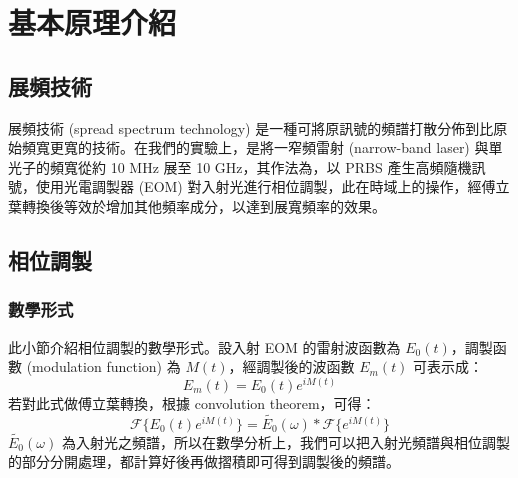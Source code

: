 \documentclass[class=NCU_thesis, crop=false]{standalone}
\begin{document}
\chapter{基本原理介紹}

\section{展頻技術}

展頻技術 (spread spectrum technology) 是一種可將原訊號的頻譜打散分佈到比原始頻寬更寬的技術。在我們的實驗上，是將一窄頻雷射 (narrow-band laser) 與單光子的頻寬從約 10 MHz 展至 10 GHz，其作法為，以 PRBS 產生高頻隨機訊號，使用光電調製器 (EOM) 對入射光進行相位調製，此在時域上的操作，經傅立葉轉換後等效於增加其他頻率成分，以達到展寬頻率的效果。
\section{相位調製}

\subsection{數學形式}
此小節介紹相位調製的數學形式。設入射 EOM 的雷射波函數為 $E_{0}(t)$，調製函數 (modulation function) 為 $M(t)$，經調製後的波函數 $E_{m}(t)$ 可表示成：
\begin{equation}
    E_{m}(t)=E_{0}(t)e^{iM(t)}
\end{equation}
若對此式做傅立葉轉換，根據 convolution theorem，可得：
\begin{equation}
\label{eq:modulation_function}
    \mathscr{F}\{E_{0}(t)e^{iM(t)}\}=\tilde{E_{0}}(\omega)*\mathscr{F}\{{e^{iM(t)}}\}
\end{equation}
$\tilde{E_{0}}(\omega)$ 為入射光之頻譜，所以在數學分析上，我們可以把入射光頻譜與相位調製的部分分開處理，都計算好後再做摺積即可得到調製後的頻譜。
\end{document}
